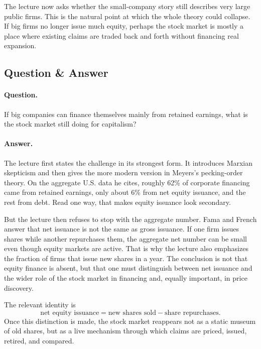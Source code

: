 The lecture now asks whether the small-company story still describes very large public firms. This is the natural point at which the whole theory could collapse. If big firms no longer issue much equity, perhaps the stock market is mostly a place where existing claims are traded back and forth without financing real expansion.

\subsection{Question \& Answer}

\paragraph{Question.} If big companies can finance themselves mainly from retained earnings, what is the stock market still doing for capitalism?

\paragraph{Answer.} The lecture first states the challenge in its strongest form. It introduces Marxian skepticism and then gives the more modern version in Meyers's pecking-order theory. On the aggregate U.S. data he cites, roughly 62\% of corporate financing came from retained earnings, only about 6\% from net equity issuance, and the rest from debt. Read one way, that makes equity issuance look secondary.

But the lecture then refuses to stop with the aggregate number. Fama and French answer that net issuance is not the same as gross issuance. If one firm issues shares while another repurchases them, the aggregate net number can be small even though equity markets are active. That is why the lecture also emphasizes the fraction of firms that issue new shares in a year. The conclusion is not that equity finance is absent, but that one must distinguish between net issuance and the wider role of the stock market in financing and, equally important, in price discovery.

The relevant identity is
\begin{equation}
\text{net equity issuance}
=
\text{new shares sold}
-
\text{share repurchases}.
\end{equation}
Once this distinction is made, the stock market reappears not as a static museum of old shares, but as a live mechanism through which claims are priced, issued, retired, and compared.

